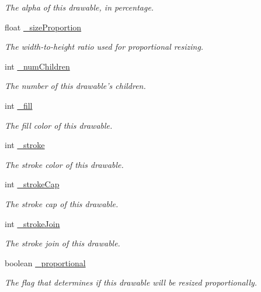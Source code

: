 \begin{DoxyCompactItemize}
\begin{DoxyCompactList}\small\item\em The alpha of this drawable, in percentage. \end{DoxyCompactList}\item 
float \hyperlink{classhype_1_1drawable_1_1_h_drawable_ac392c998fcc0709faa477e2ffa0d8b00}{\-\_\-size\-Proportion}
\begin{DoxyCompactList}\small\item\em The width-\/to-\/height ratio used for proportional resizing. \end{DoxyCompactList}\item 
int \hyperlink{classhype_1_1drawable_1_1_h_drawable_a1e2205f639598af5f419b82ae5bdc0cf}{\-\_\-num\-Children}
\begin{DoxyCompactList}\small\item\em The number of this drawable's children. \end{DoxyCompactList}\item 
int \hyperlink{classhype_1_1drawable_1_1_h_drawable_a3f0dce6dfbc31cc1538d8e21c9c12194}{\-\_\-fill}
\begin{DoxyCompactList}\small\item\em The fill color of this drawable. \end{DoxyCompactList}\item 
int \hyperlink{classhype_1_1drawable_1_1_h_drawable_af1f14544d296c95e0e3323b045a474bc}{\-\_\-stroke}
\begin{DoxyCompactList}\small\item\em The stroke color of this drawable. \end{DoxyCompactList}\item 
int \hyperlink{classhype_1_1drawable_1_1_h_drawable_aecbc1d0d94d82b8b6cd3c5ebb3aa49d7}{\-\_\-stroke\-Cap}
\begin{DoxyCompactList}\small\item\em The stroke cap of this drawable. \end{DoxyCompactList}\item 
int \hyperlink{classhype_1_1drawable_1_1_h_drawable_adccbb5aa62cca3f1615e79af5eed0c99}{\-\_\-stroke\-Join}
\begin{DoxyCompactList}\small\item\em The stroke join of this drawable. \end{DoxyCompactList}\item 
boolean \hyperlink{classhype_1_1drawable_1_1_h_drawable_a7f9bb1ed841a8c8fe52e351ee3bf5844}{\-\_\-proportional}
\begin{DoxyCompactList}\small\item\em The flag that determines if this drawable will be resized proportionally. \end{DoxyCompactList}\end{DoxyCompactItemize}


